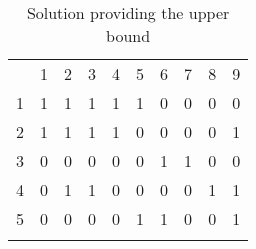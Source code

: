 \documentclass[citeauthoryear]{llncs}
\begin{document}
\begin{table}
\centering
        \begin{tabular}{ c|ccccccccc|}
                  \multicolumn{1}{c}{~} & \multicolumn{1}{c}{1} & \multicolumn{1}{c}{2} & \multicolumn{1}{c}{3} & \multicolumn{1}{c}{4} & \multicolumn{1}{c}{5} & \multicolumn{1}{c}{6} & \multicolumn{1}{c}{7} & \multicolumn{1}{c}{8} & \multicolumn{1}{c}{9} \\
                   \hhline{~---------}
                  1 & \cellcolor{yellow}1  & \cellcolor{yellow}1 &\cellcolor{yellow}1 &\cellcolor{yellow}1 &\multicolumn{1}{c|}{\cellcolor{yellow}1} &0 &0 &0 &\cellcolor{yellow}0\\
                  2 &\cellcolor{yellow}1 &\cellcolor{yellow}1 &\cellcolor{yellow}1 &\cellcolor{yellow}1 &\multicolumn{0}{c|}{\cellcolor{yellow}0} &0 &0 &0 &\cellcolor{yellow}1\\
                   \hhline{~-------}
                  3 &0 &0 &0 &0 &0 &\multicolumn{1}{|c}{\cellcolor{green}1} &\multicolumn{1}{c|}{\cellcolor{green}1} &0 &0\\
                   \hhline{~~~~~~--}
                  4 &0 &\cellcolor{yellow}1 &\cellcolor{yellow}1 &0 &0 &0 &0 &\cellcolor{yellow}1 &\cellcolor{yellow}1\\
                  5 &0 &0 &0 &0 &1 &\cellcolor{green}1 &\cellcolor{green}0 &0 &\cellcolor{green}1\\
                  \hhline{~---------}
        \end{tabular}
        \caption{Solution providing the upper bound}
\label{sol}
\end{table}
\end{document}
